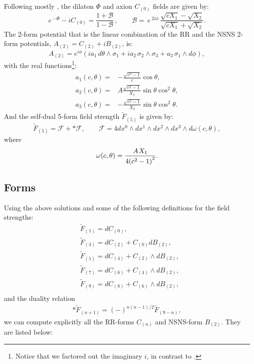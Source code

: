 Following mostly \cite{Pilch:2003jg}, the dilaton $\Phi$ and axion $C_{(0)}$ fields are given by:
\begin{equation}
 e\,^{-\Phi }-i C_{(0)} =\frac{1+\mathcal{B}}{1-\mathcal{B}}\,,
 \qquad
 \mathcal{B}=\,e\,^{2i\phi }\,\frac{\sqrt{cX_1}-\sqrt{X_2}}{\sqrt{cX_1}+\sqrt{X_2}}.
\end{equation}
The 2-form potential that is the linear combination of the RR and the NSNS 2-form potentials, $A_{(2)}=C_{(2)}+i B_{(2)}$, is:
\begin{equation}
 A_{(2)} = e^{i \phi}\left(i a_1 \, d\theta \wedge \sigma_1 + i a_2 \, \sigma_2 \wedge \sigma_3 + a_3\, \sigma_1 \wedge d\phi\right),
\end{equation}
with the real functions\footnote{Notice that we factored out the imaginary $i$, in contrast to \cite{Pilch:2003jg}.}:
\begin{align}
a_1(c,\theta) = & - \frac{\sqrt{c^2-1}}{c}\cos\theta,\nonumber\\
a_2(c,\theta) =  & A  \frac{\sqrt{c^2-1}}{X_1}\sin \theta \cos^2 \theta,\nonumber\\
a_3(c,\theta) =  &  -\frac{\sqrt{c^2-1}}{X_2}\sin \theta \cos^2 \theta.
\end{align}
And the self-dual 5-form field strength $\tilde{F}_{(5)}$ is given by:
\begin{equation}
\tilde{F}_{(5)} = \mathcal{F} + *\mathcal{F},
\qquad
\mathcal{F} = 4 d{x^0} \wedge d{x^1} \wedge d{x^2} \wedge d{x^3} \wedge d\omega(c,\theta),
\end{equation}
where 
\begin{equation}
\omega(c,\theta) = \frac{{A{\kern 1pt} {X_1}}}{{4{{\left( {{c^2} - 1} \right)}^2}}}.
\end{equation}


\subsection{Forms}
Using the above solutions and some of the following definitions for the field strengths:
\begin{align}\label{eq:defs2}
&\tilde F_{(1)} = d C_{(0)},\nonumber\\
&\tilde F_{(3)} = d C_{(2)} + C_{(0)} d B_{(2)},\nonumber\\
&\tilde F_{(5)} = d C_{(4)} + C_{(2)} \wedge d B_{(2)},\nonumber\\
&\tilde F_{(7)} = d C_{(6)} + C_{(4)} \wedge d B_{(2)},\nonumber\\
&\tilde F_{(9)} = d C_{(8)} + C_{(6)} \wedge d B_{(2)},\nonumber\\
\end{align}
and the duality relation
\begin{align}\label{eq:dualityconstraint}
\ast \tilde F_{(n+1)} =(-)^{n(n-1)/2} \tilde F_{(9-n)},
\end{align}
we can compute explicitly all the RR-forms $C_{(n)}$ and NSNS-form $B_{(2)}$. They are listed below:


